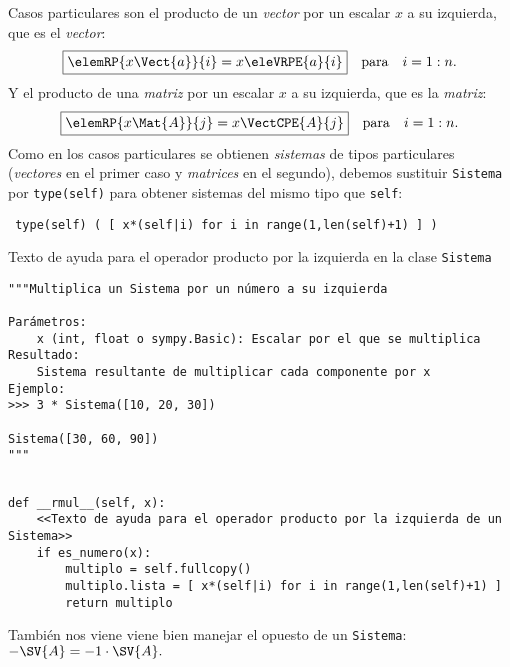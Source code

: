 \documentclass[11pt]{report}
\begin{document}
Casos particulares son el producto de un \emph{vector} 
por un escalar \(x\) a su izquierda, que es el \emph{vector}:
\begin{displaymath}
  \fbox{\begin{math} 
      \elemRP{x\Vect{a}}{i}=x \eleVRPE{a}{i}
  \end{math}}\quad\text{para}\quad i=1:n.
\end{displaymath}
Y el producto de una \emph{matriz}  por un escalar \(x\) a su
izquierda, que es la \emph{matriz}:
\begin{displaymath}
  \fbox{\begin{math} 
      \elemRP{x\Mat{A}}{j}=x\VectCPE{A}{j}
    \end{math}}\quad\text{para}\quad i=1:n.
\end{displaymath}
Como en los casos particulares se obtienen \emph{sistemas} de tipos
particulares (\emph{vectores} en el primer caso y \emph{matrices} en el
segundo), debemos sustituir \texttt{Sistema} por \texttt{type(self)} para
obtener sistemas del mismo tipo que \texttt{self}:
\begin{center}
  \Verb/ type(self) ( [ x*(self|i) for i in range(1,len(self)+1) ] ) /
\end{center}

Texto de ayuda para el operador producto por la izquierda en la clase \texttt{Sistema}
\begin{verbatim}
"""Multiplica un Sistema por un número a su izquierda

Parámetros:
    x (int, float o sympy.Basic): Escalar por el que se multiplica
Resultado:
    Sistema resultante de multiplicar cada componente por x
Ejemplo:
>>> 3 * Sistema([10, 20, 30]) 

Sistema([30, 60, 90]) 
"""
\end{verbatim}

\begin{verbatim}

def __rmul__(self, x):
    <<Texto de ayuda para el operador producto por la izquierda de un Sistema>>
    if es_numero(x):
        multiplo = self.fullcopy()
        multiplo.lista = [ x*(self|i) for i in range(1,len(self)+1) ]
        return multiplo

\end{verbatim}

También nos viene viene bien manejar el opuesto de un \texttt{Sistema}:
\begin{math}
 -\SV{A}=-1\cdot\SV{A}.
\end{math}
\end{document}

